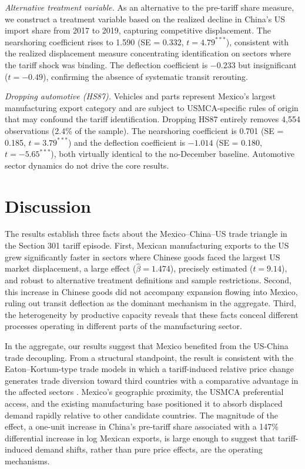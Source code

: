 \documentclass[11pt]{article}
\begin{document}
\textit{Alternative treatment variable.}
As an alternative to the pre-tariff share measure, we construct a
treatment variable based on the realized decline in China's US import
share from 2017 to 2019, capturing competitive displacement. The nearshoring coefficient rises to 1.590
(SE = 0.332, $t = 4.79^{***}$), consistent with the realized displacement
measure concentrating identification on sectors where the tariff shock was
binding. The deflection coefficient is $-0.233$ but insignificant
($t = -0.49$), confirming the absence of systematic transit rerouting.

\textit{Dropping automotive (HS87).}
Vehicles and parts represent Mexico's largest manufacturing export
category and are subject to USMCA-specific rules of origin that may
confound the tariff identification. Dropping HS87 entirely removes 4,554
observations (2.4\% of the sample). The nearshoring coefficient is 0.701
(SE = 0.185, $t = 3.79^{***}$) and the deflection coefficient is $-1.014$
(SE = 0.180, $t = -5.65^{***}$), both virtually identical to the
no-December baseline. Automotive sector dynamics do not drive the core results.

\FloatBarrier
\section{Discussion}

The results establish three facts about the Mexico--China--US trade
triangle in the Section 301 tariff episode. First, Mexican manufacturing
exports to the US grew significantly faster in sectors where Chinese goods
faced the largest US market displacement, a large effect
($\hat{\beta} = 1.474$), precisely estimated ($t = 9.14$), and robust to
alternative treatment definitions and sample restrictions. Second, this increase in Chinese goods did not accompany expansion
flowing into Mexico, ruling out transit deflection as the dominant
mechanism in the aggregate. Third, the heterogeneity by productive
capacity reveals that these facts conceal different
processes operating in different parts of the manufacturing sector.

In the aggregate, our results suggest that Mexico benefited from the US-China trade decoupling. From a structural standpoint, the result is consistent with the Eaton--Kortum-type
trade models in which a tariff-induced relative price change generates
trade diversion toward third countries with a comparative advantage in the
affected sectors \citep{EatonKortum2002}. Mexico's geographic proximity, the USMCA preferential
access, and the existing manufacturing base positioned it to absorb
displaced demand rapidly relative to other candidate countries. The
magnitude of the effect, a one-unit increase in China's pre-tariff
share associated with a 147\% differential increase in log Mexican exports, is large enough to suggest that tariff-induced demand shifts, rather
than pure price effects, are the operating mechanisms.
\end{document}
